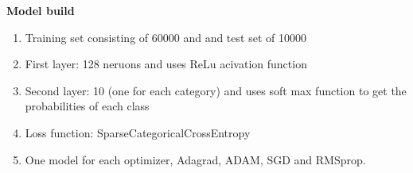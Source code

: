 \documentclass{beamer}
\newcommand\myheading[1]{%
  \par\bigskip
  {\Large\bfseries#1}\par\smallskip}
\begin{document}
\begin{frame}
    \myheading{Model build}
    \begin{enumerate}
        \item{Training set consisting of 60000 and and test set of 10000}
        \item First layer: 128 neruons and uses ReLu acivation function
        \item Second layer: 10 (one for each category) and uses soft max function to get the probabilities of each class
        \item Loss function: SparseCategoricalCrossEntropy
        \item One model for each optimizer, Adagrad, ADAM, SGD and RMSprop. 
    \end{enumerate}
\end{frame}
\end{document}
